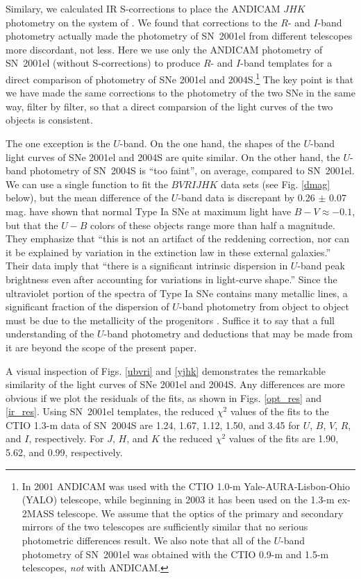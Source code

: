 \documentclass[12pt,preprint,psfig,epsf]{aastex}
\newcommand{\bvrijhk}{\protect\hbox{$BV\!RIJHK$} }
\begin{document}
Similary, we calculated IR S-corrections to place the ANDICAM $JHK$
photometry on the system of \citet{Per_etal98}.  We found that corrections
to the $R$- and $I$-band photometry actually made the photometry of
SN~2001el from different telescopes more discordant, not less.  Here we use
only the ANDICAM photometry of SN~2001el (without S-corrections) to produce
$R$- and $I$-band templates for a direct comparison of photometry of SNe
2001el and 2004S.\footnote[15]{In 2001 ANDICAM was used with the CTIO 1.0-m
Yale-AURA-Lisbon-Ohio (YALO) telescope, while beginning in 2003 it has been
used on the 1.3-m ex-2MASS telescope.  We assume that the optics of the
primary and secondary mirrors of the two telescopes are sufficiently similar
that no serious photometric differences result.  We also note that all of
the $U$-band photometry of SN~2001el was obtained with the CTIO 0.9-m and 1.5-m
telescopes, {\em not} with ANDICAM.} The key point is that we
have made the same corrections to the photometry of the two SNe 
in the same way, filter by filter, so that a direct comparsion of the 
light curves of the two objects is consistent.  

The one exception is the $U$-band.  On the one hand, the shapes of the
$U$-band light curves of SNe 2001el and 2004S are quite similar.  On the
other hand, the $U$-band photometry of SN~2004S is ``too faint'',
on average, compared to SN~2001el.  We can use a
single function to fit the \bvrijhk data sets (see Fig. \ref{dmag} below),
but the mean difference of the $U$-band data is discrepant by 0.26 $\pm$ 0.07 
mag. \citet[][Fig. 9]{Jha_etal06a} have shown that normal Type Ia SNe at
maximum light have $B-V \approx -0.1$, but that the $U-B$ colors of these 
objects range more than half a magnitude.  They emphasize that
``this is not an artifact of the reddening correction, nor can it be
explained by variation in the extinction law in these external galaxies.''
Their data imply that ``there is a significant intrinsic dispersion in
$U$-band peak brightness even after accounting for variations in light-curve
shape.''  Since the ultraviolet portion of the spectra of Type Ia SNe
contains many metallic lines, a significant fraction of the dispersion
of $U$-band photometry from object to object must be due to the metallicity
of the progenitors \citep{Hoe_etal98, Pod_etal06}.
Suffice it to say that a full understanding of the $U$-band 
photometry and deductions that may be made from it are beyond the scope
of the present paper.

A visual inspection of Figs. \ref{ubvri} and \ref{yjhk} demonstrates the
remarkable similarity of the light curves of SNe 2001el and 2004S.  Any
differences are more obvious if we plot the residuals of the fits, as
shown in Figs. \ref{opt_res} and \ref{ir_res}. Using SN~2001el templates,
the reduced $\chi^2$ values of the fits to the CTIO 1.3-m data of SN~2004S
are 1.24, 1.67, 1.12, 1.50, and 3.45 for $U$, $B$, $V$, $R$, and $I$,
respectively. For $J$, $H$, and $K$ the reduced $\chi^2$ values of the
fits are 1.90, 5.62, and 0.99, respectively. 
\end{document}

